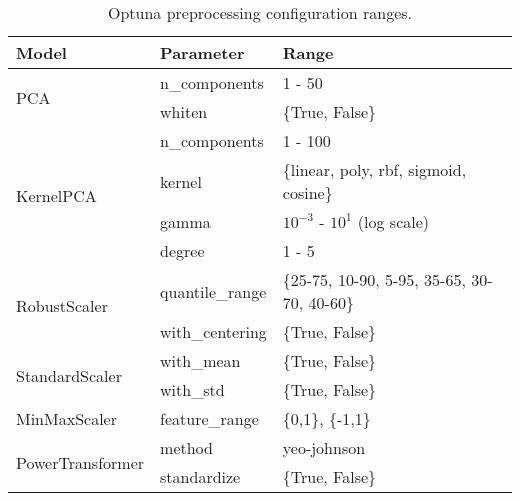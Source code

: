 \begin{table*}
\centering
\caption{Optuna preprocessing configuration ranges.}
\begin{tabular}{@{}l>{\ttfamily}lp{}@{}}
\toprule
\textbf{Model}                       & \textbf{Parameter}                & \textbf{Range}                           \\ \midrule
\multirow{2}{*}{PCA}                 & n\_components                     & 1 - 50                                   \\ \cmidrule{2-3}
                                     & whiten                            & \{True, False\}                          \\ \midrule
\multirow{4}{*}{KernelPCA}           & n\_components                     & 1 - 100                                  \\ \cmidrule{2-3}
                                     & kernel                            & \{linear, poly, rbf, sigmoid, cosine\}   \\ \cmidrule{2-3}
                                     & gamma                             & $10^{-3}$ - $10^{1}$ (log scale)         \\ \cmidrule{2-3}
                                     & degree                            & 1 - 5                                    \\ \midrule
\multirow{2}{*}{RobustScaler}        & quantile\_range                   & \{25-75, 10-90, 5-95, 35-65, 30-70, 40-60\} \\ \cmidrule{2-3}
                                     & with\_centering                   & \{True, False\}                          \\ \midrule
\multirow{2}{*}{StandardScaler}      & with\_mean                        & \{True, False\}                          \\ \cmidrule{2-3}
                                     & with\_std                         & \{True, False\}                          \\ \midrule
MinMaxScaler                         & feature\_range                    & \{0,1\}, \{-1,1\}                        \\ \midrule
\multirow{2}{*}{PowerTransformer}    & method                            & yeo-johnson                              \\ \cmidrule{2-3}
                                     & standardize                       & \{True, False\}                          \\ \midrule

\end{tabular}
\end{table*}
